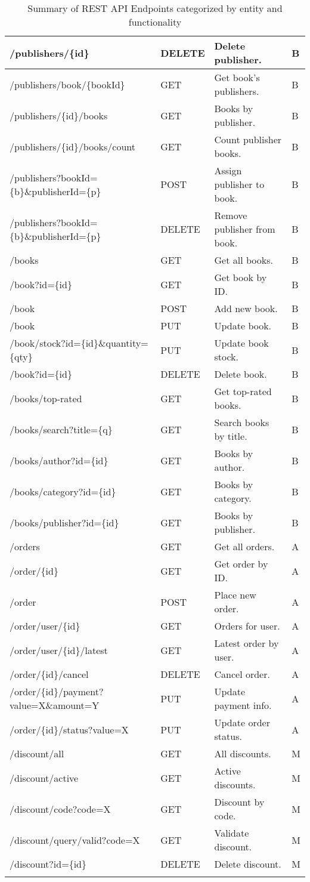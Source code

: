 \begin{longtable}{|p{}|p{} |p{}|p{}|}
\hline
/publishers/\{id\} & DELETE & Delete publisher. & B \\
\hline
/publishers/book/\{bookId\} & GET & Get book’s publishers. & B \\
\hline
/publishers/\{id\}/books & GET & Books by publisher. & B \\
\hline
/publishers/\{id\}/books/count & GET & Count publisher books. & B \\
\hline
/publishers?bookId=\{b\}\&publisherId=\{p\} & POST & Assign publisher to book. & B \\
\hline
/publishers?bookId=\{b\}\&publisherId=\{p\} & DELETE & Remove publisher from book. & B \\
\hline
/books & GET & Get all books. & B \\
\hline
/book?id=\{id\} & GET & Get book by ID. & B \\
\hline
/book & POST & Add new book. & B \\
\hline
/book & PUT & Update book. & B \\
\hline
/book/stock?id=\{id\}\&quantity=\{qty\} & PUT & Update book stock. & B \\
\hline
/book?id=\{id\} & DELETE & Delete book. & B \\
\hline
/books/top-rated & GET & Get top-rated books. & B \\
\hline
/books/search?title=\{q\} & GET & Search books by title. & B \\
\hline
/books/author?id=\{id\} & GET & Books by author. & B \\
\hline
/books/category?id=\{id\} & GET & Books by category. & B \\
\hline
/books/publisher?id=\{id\} & GET & Books by publisher. & B \\
\hline
/orders & GET & Get all orders. & A \\
\hline
/order/\{id\} & GET & Get order by ID. & A \\
\hline
/order & POST & Place new order. & A \\
\hline
/order/user/\{id\} & GET & Orders for user. & A \\
\hline
/order/user/\{id\}/latest & GET & Latest order by user. & A \\
\hline
/order/\{id\}/cancel & DELETE & Cancel order. & A \\
\hline
/order/\{id\}/payment?value=X\&amount=Y & PUT & Update payment info. & A \\
\hline
/order/\{id\}/status?value=X & PUT & Update order status. & A \\
\hline
/discount/all & GET & All discounts. & M \\
\hline
/discount/active & GET & Active discounts. & M \\
\hline
/discount/code?code=X & GET & Discount by code. & M \\
\hline
/discount/query/valid?code=X & GET & Validate discount. & M \\
\hline
/discount?id=\{id\} & DELETE & Delete discount. & M \\
\hline

\caption{Summary of REST API Endpoints categorized by entity and functionality}
\label{tab:apiSummary}
\end{longtable}
